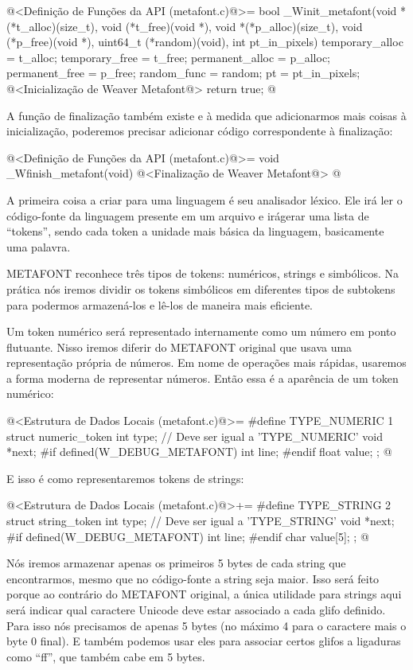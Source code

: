 \iniciocodigo
@<Definição de Funções da API (metafont.c)@>=
bool _Winit_metafont(void *(*t_alloc)(size_t),
                     void (*t_free)(void *),
                     void *(*p_alloc)(size_t),
                     void (*p_free)(void *),
                     uint64_t (*random)(void), int pt_in_pixels){
  temporary_alloc = t_alloc;
  temporary_free = t_free;
  permanent_alloc = p_alloc;
  permanent_free = p_free;
  random_func = random;
  pt = pt_in_pixels;
  @<Inicialização de Weaver Metafont@>
  return true;
}
@
\fimcodigo

A função de finalização também existe e à medida que adicionarmos mais
coisas à inicialização, poderemos precisar adicionar código
correspondente à finalização:

\iniciocodigo
@<Definição de Funções da API (metafont.c)@>=
void _Wfinish_metafont(void){
  @<Finalização de Weaver Metafont@>
}
@
\fimcodigo


A primeira coisa a criar para uma linguagem é seu analisador
léxico. Ele irá ler o código-fonte da linguagem presente em um arquivo
e irágerar uma lista de ``tokens'', sendo cada token a unidade mais
básica da linguagem, basicamente uma palavra.

METAFONT reconhece três tipos de tokens: numéricos, strings e
simbólicos. Na prática nós iremos dividir os tokens simbólicos em
diferentes tipos de subtokens para podermos armazená-los e lê-los de
maneira mais eficiente.

Um token numérico será representado internamente como um número em
ponto flutuante. Nisso iremos diferir do METAFONT original que usava
uma representação própria de números. Em nome de operações mais
rápidas, usaremos a forma moderna de representar números. Então essa é
a aparência de um token numérico:

\iniciocodigo
@<Estrutura de Dados Locais (metafont.c)@>=
#define TYPE_NUMERIC 1
struct numeric_token{
  int type;   // Deve ser igual a 'TYPE_NUMERIC'
  void *next;
#if defined(W_DEBUG_METAFONT)
  int line;
#endif
  float value;
};
@
\fimcodigo

E isso é como representaremos tokens de strings:

\iniciocodigo
@<Estrutura de Dados Locais (metafont.c)@>+=
#define TYPE_STRING 2
struct string_token{
  int type;   // Deve ser igual a 'TYPE_STRING'
  void *next;
#if defined(W_DEBUG_METAFONT)
  int line;
#endif
  char value[5];
};
@
\fimcodigo

Nós iremos armazenar apenas os primeiros 5 bytes de cada string que
encontrarmos, mesmo que no código-fonte a string seja maior. Isso será
feito porque ao contrário do METAFONT original, a única utilidade para
strings aqui será indicar qual caractere Unicode deve estar associado
a cada glifo definido. Para isso nós precisamos de apenas 5 bytes (no
máximo 4 para o caractere mais o byte 0 final). E também podemos usar
eles para associar certos glifos a ligaduras como ``ff'', que também
cabe em 5 bytes.


